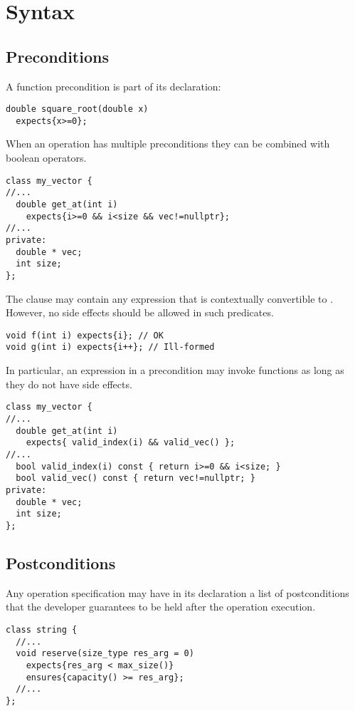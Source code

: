 \section{Syntax}

\subsection{Preconditions}

A function precondition is part of its declaration:

\begin{lstlisting}
double square_root(double x)
  expects{x>=0};
\end{lstlisting}

When an operation has multiple preconditions they can be combined with boolean operators.

\begin{lstlisting}
class my_vector {
//...
  double get_at(int i)
    expects{i>=0 && i<size && vec!=nullptr};
//...
private:
  double * vec;
  int size;
};
\end{lstlisting}

The  clause may contain any expression that is contextually
convertible to . However, no side effects should be allowed in such
predicates.

\begin{lstlisting}
void f(int i) expects{i}; // OK
void g(int i) expects{i++}; // Ill-formed
\end{lstlisting}

In particular, an expression in a precondition may invoke functions as long as
they do not have side effects.

\begin{lstlisting}
class my_vector {
//...
  double get_at(int i)
    expects{ valid_index(i) && valid_vec() };
//...
  bool valid_index(i) const { return i>=0 && i<size; }
  bool valid_vec() const { return vec!=nullptr; }
private:
  double * vec;
  int size;
};
\end{lstlisting}

\subsection{Postconditions}

Any operation specification may have in its declaration a list of
postconditions that the developer guarantees to be held after the operation
execution.

\begin{lstlisting}
class string {
  //...
  void reserve(size_type res_arg = 0)
    expects{res_arg < max_size()}
    ensures{capacity() >= res_arg};
  //...
};
\end{lstlisting}

